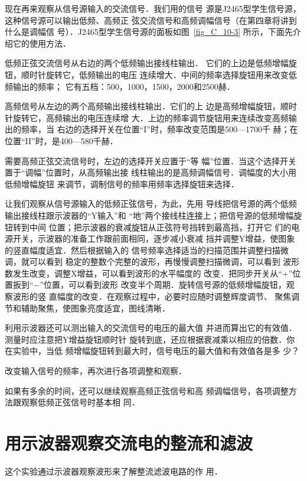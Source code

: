 现在再来观察从信号源输入的交流信号．我们用的信号
源是J2465型学生信号源，这种信号源可以输出低频、高频正
弦交流信号和高频调幅信号（在第四章将讲到什么是调幅信
号）．J2465型学生信号源的面板如图~\ref{fig_C_10-3} 所示，下面先介
绍它的使用方法．

低频正弦交流信号从右边的两个低频输出接线柱输出．
它们的上边是低频增幅旋钮，顺时针旋转它，低频输出的电压
连续增大．中间的频率选择旋钮用来改变低频输出的频率；
它有五档：500，1000，1500，2000和2500赫．

高频信号从左边的两个高频输出接线柱输出．它们的上
边是高频增幅旋钮，顺时针旋转它，高频输出的电压连续增
大．上边的频率调节旋钮用来连续改变高频输出的频率，当
右边的选择开关在位置“I”时，频率改变范围是500—1700千
赫；在位置“II”时，是400—580千赫．

需要高频正弦交流信号时，左边的选择开关应置于“等
幅”位置．当这个选择开关置于“调幅”位置时，从高频输出接
线柱输出的是高频调幅信号．调幅度的大小用低频增幅旋钮
来调节，调制信号的频率用频率选择旋钮来选择．

让我们观察从信号源输入的低频正弦信号，为此，先用
导线把信号源的两个低频输出接线柱跟示波器的“Y输入”和
“地”两个接线柱连接上；把信号源的低频增幅旋钮转到中间
位置；把示波器的衰减旋钮从正弦符号挡转到最高挡，打开它
们的电源开关，示波器的准备工作跟前面相同，逐步减小衰减
挡并调整Y增益，使图象的竖直幅度适宜．然后根据输入的
信号频率选择适当的扫描范围并调整扫描微调，就可以看到
稳定的整数个完整的波形，再慢慢调整扫描微调，可以看到
波形数发生改变，调整X增益，可以看到波形的水平幅度的
改变．把同步开关从“$+$”位置扳到“$-$”位置，可以看到波形
改变半个周期．旋转信号源的低频增幅旋钮，观察波形的竖
直幅度的改变．在观察过程中，必要时应随时调整辉度调节、
聚焦调节和辅助聚焦，使图象亮度适宜，图线清晰．

利用示波器还可以测出输入的交流信号的电压的最大值
并进而算出它的有效值．测量时应注意把Y增益旋钮顺时针
旋转到底，还应根据衰减乘以相应的倍数．你在实验中，当低
频增幅旋钮转到最大时，信号电压的最大值和有效值各是多
少？

改变输入信号的频率，再次进行各项调整和观察．

如果有多余的时间，还可以继续观察高频正弦信号和高
频调幅信号，各项调整方法跟观察低频正弦信号时基本相
同．

\section{用示波器观察交流电的整流和滤波}

这个实验通过示波器观察波形来了解整流滤波电路的作
用．

